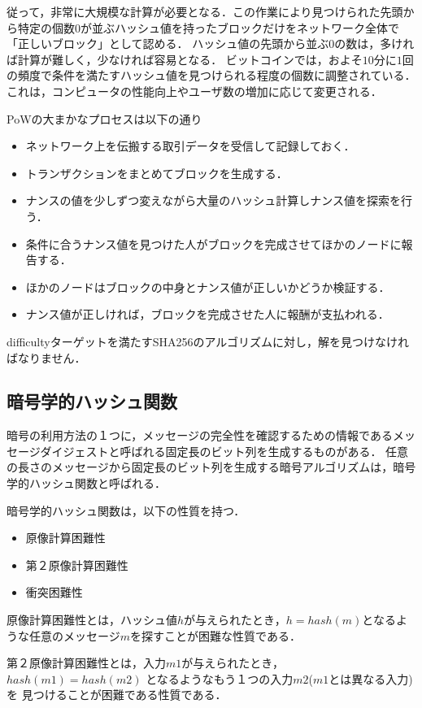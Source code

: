 \documentclass[a4paper,12pt]{jsarticle}
\begin{document}
従って，非常に大規模な計算が必要となる．この作業により見つけられた先頭から特定の個数$0$が並ぶハッシュ値を持ったブロックだけをネットワーク全体で「正しいブロック」として認める．
ハッシュ値の先頭から並ぶ$0$の数は，多ければ計算が難しく，少なければ容易となる．
ビットコインでは，およそ$10$分に$1$回の頻度で条件を満たすハッシュ値を見つけられる程度の個数に調整されている．
これは，コンピュータの性能向上やユーザ数の増加に応じて変更される．


PoWの大まかなプロセスは以下の通り
\begin{itemize}
  \item ネットワーク上を伝搬する取引データを受信して記録しておく．
  \item トランザクションをまとめてブロックを生成する．
  \item ナンスの値を少しずつ変えながら大量のハッシュ計算しナンス値を探索を行う．
  \item 条件に合うナンス値を見つけた人がブロックを完成させてほかのノードに報告する．
  \item ほかのノードはブロックの中身とナンス値が正しいかどうか検証する．
  \item ナンス値が正しければ，ブロックを完成させた人に報酬が支払われる．
\end{itemize}

difficultyターゲットを満たすSHA256のアルゴリズムに対し，解を見つけなければなりません．

      \subsection*{暗号学的ハッシュ関数} %

暗号の利用方法の１つに，メッセージの完全性を確認するための情報であるメッセージダイジェストと呼ばれる固定長のビット列を生成するものがある．
任意の長さのメッセージから固定長のビット列を生成する暗号アルゴリズムは，暗号学的ハッシュ関数と呼ばれる．

暗号学的ハッシュ関数は，以下の性質を持つ．
\begin{itemize}
  \item 原像計算困難性
  \item 第２原像計算困難性
  \item 衝突困難性
\end{itemize}

原像計算困難性とは，ハッシュ値$h$が与えられたとき，$ h = hash(m)$となるような任意のメッセージ$m$を探すことが困難な性質である．

第２原像計算困難性とは，入力$m1$が与えられたとき，$ hash(m1) = hash(m2)$ となるようなもう１つの入力$m2$($m1$とは異なる入力)を
見つけることが困難である性質である．
\end{document}
